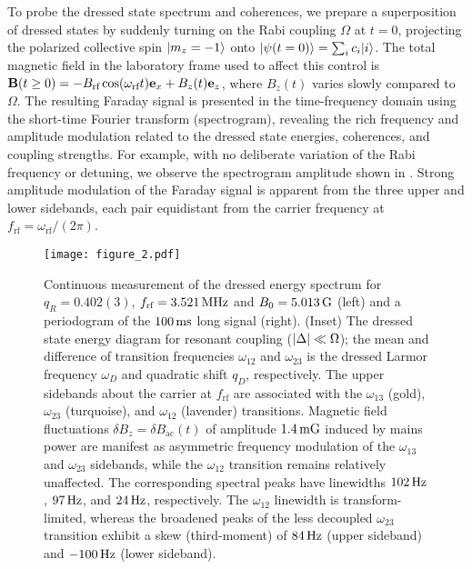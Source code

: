 \documentclass[aps,prl,reprint,superscriptaddress,floatfix]{revtex4-1}
\begin{document}
To probe the dressed state spectrum and coherences, we prepare a superposition of dressed states by suddenly turning on the Rabi coupling $\Omega$ at $t=0$, projecting the polarized collective spin $\vert m_z=-1 \rangle $ onto $\vert \psi(t=0) \rangle  = \sum_i c_i \vert i \rangle $.
The total magnetic field in the laboratory frame used to affect this control is $\mathbf{B}(t \geq 0) = -B_{\text{rf}} \cos (\omega_{\text{rf}} t) \mathbf{e}_x + B_z(t) \mathbf{e}_z$, where $B_z(t)$ varies slowly compared to $\Omega$.
The resulting Faraday signal is presented in the time-frequency domain using the short-time Fourier transform (spectrogram), revealing the rich frequency and amplitude modulation related to the dressed state energies, coherences, and coupling strengths.
For example, with no deliberate variation of the Rabi frequency or detuning, we observe the spectrogram amplitude shown in .
Strong amplitude modulation of the Faraday signal is apparent from the three upper and lower sidebands, each pair equidistant from the carrier frequency at $f_{\text{rf}} = \omega_{\text{rf}}/(2\pi)$. 
\begin{figure}
    \texttt{[image: figure\_2.pdf]}
    \caption{
    \label{fig:static_coupling}
    Continuous measurement of the dressed energy spectrum for $q_R = 0.402(3)$, $f_{\text{rf}}=\unit[3.521]{MHz}$ and $B_0=\unit[5.013]{G}$ (left) and a periodogram of the $\unit[100]{ms}$ long signal (right). 
    (Inset) The dressed state energy diagram for resonant coupling ($\vert \Delta \vert  \ll \Omega$); the mean and difference of transition frequencies $\omega_{12}$ and $\omega_{23}$ is the dressed Larmor frequency $\omega_D$ and quadratic shift $q_D$, respectively.
    The upper sidebands about the carrier at $f_{\text{rf}}$ are associated with the $\omega_{13}$ (gold), $\omega_{23}$ (turquoise), and $\omega_{12}$ (lavender) transitions.  
    Magnetic field fluctuations $\delta B_z = \delta B_{\text{ac}}(t)$ of amplitude $\unit[1.4]{mG}$ induced by mains power are manifest as asymmetric frequency modulation of the $\omega_{13}$ and $\omega_{23}$ sidebands, while the $\omega_{12}$ transition remains relatively unaffected.
    The corresponding spectral peaks have linewidths $\unit[102]{Hz}$, $\unit[97]{Hz}$, and $\unit[24]{Hz}$, respectively.
    The $\omega_{12}$ linewidth is transform-limited, whereas the broadened peaks of the less decoupled $\omega_{23}$ transition exhibit a skew (third-moment) of $\unit[84]{Hz}$ (upper sideband) and $-\unit[100]{Hz}$ (lower sideband).
    }
\end{figure}
\end{document}
